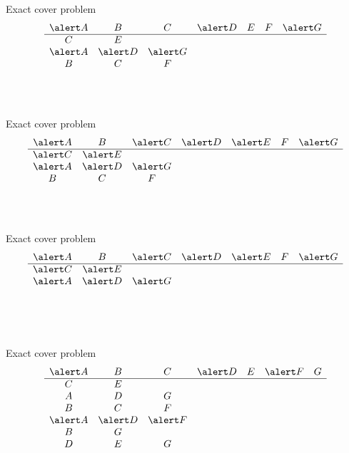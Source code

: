 \documentclass{beamer}
\begin{document}
%
\begin{frame}{Exact cover problem} 
  $$
  \begin{array}{ccccccc}
    \alert A & B & C & \alert D & E & F & \alert G\\
    \hline
    C & E &&&&&\\
    \alert A & \alert D & \alert G &&&&\\
    B & C & F &&&&\\
    &&&&&&\\
    &&&&&&\\
    &&&&&&
  \end{array}
  $$
\end{frame}

%
\begin{frame}{Exact cover problem} 
  $$
  \begin{array}{ccccccc}
    \alert A & B & \alert C & \alert D & \alert E & F & \alert G\\
    \hline
    \alert C & \alert E &&&&&\\
    \alert A & \alert D & \alert G &&&&\\
    B & C & F &&&&\\
    &&&&&&\\
    &&&&&&\\
    &&&&&&
  \end{array}
  $$
\end{frame}

%
\begin{frame}{Exact cover problem} 
  $$
  \begin{array}{ccccccc}
    \alert A & B & \alert C & \alert D & \alert E & F & \alert G\\
    \hline
    \alert C & \alert E &&&&&\\
    \alert A & \alert D & \alert G &&&&\\
    &&&&&&\\
    &&&&&&\\
    &&&&&&\\
    &&&&&&
  \end{array}
  $$
\end{frame}

%
\begin{frame}{Exact cover problem} 
  $$
  \begin{array}{ccccccc}
    \alert A & B & C & \alert D & E & \alert F & G\\
    \hline
    C & E &&&&&\\
    A & D & G &&&&\\
    B & C & F &&&&\\
    \alert A & \alert D & \alert F &&&&\\
    B & G &&&&&\\
    D & E & G &&&&
  \end{array}
  $$
\end{frame}
\end{document}
